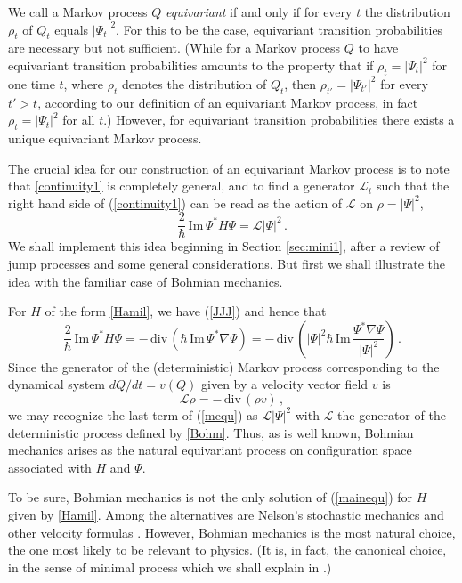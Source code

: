 \documentclass[12pt]{article}
\newcommand{\1}{\mathbf{1}} %
\renewcommand{\Im}{\mathrm{Im}} %
\renewcommand{\div}{\,\mathrm{div}\,} %
\newcommand{\generator}{\mathscr{L}} %
\begin{document}
We call a Markov process $Q$ \emph{equivariant} if and only if for every
$t$ the distribution $\rho_t$ of $Q_t$ equals $|\Psi_t|^2$. For this to 
be
the case, equivariant transition probabilities are necessary but not
sufficient. (While  for a Markov process $Q$  to have equivariant
transition probabilities amounts to the property that if $\rho_t =
|\Psi_t|^2$ for one time $t$, where $\rho_t$ denotes the distribution of
$Q_t$, then $\rho_{t'} = |\Psi_{t'}|^2$ for every $t'>t$,  according to
our definition of an equivariant Markov process, in fact $\rho_t =
|\Psi_t|^2$ for all $t$.)  However, for equivariant transition
probabilities there exists a unique equivariant Markov process.

The crucial idea for our construction of an equivariant Markov process
is to note that \eqref{continuity1} is completely general, and to find
a generator $\generator_t$ such that the right hand side of
(\ref{continuity1}) can be read as the action of $\generator$ on $\rho
= |\Psi|^2$,
\begin{equation}\label{mainequ}
    \frac{2}{\hbar} \, \Im \, \Psi^* H\Psi = \generator |\Psi|^2\,.
\end{equation}
We shall implement this idea beginning in Section \ref{sec:mini1},
after a review of jump processes and some general considerations. But
first we shall illustrate the idea with the familiar case of Bohmian
mechanics.

For $H$ of the form \eqref{Hamil}, we have (\ref{JJJ}) and hence that
\begin{equation}\label{mequ}
   \frac{2}{\hbar} \, \Im \, \Psi^*H\Psi = -\div\left(\hbar \, \Im \,
   \Psi^* \nabla\Psi \right) = -\div\left( |\Psi|^2 \hbar \, \Im \,
   \frac{\Psi^* \nabla\Psi} {|\Psi|^2} \right) \,.
\end{equation}
Since the generator of the (deterministic) Markov process
corresponding to the dynamical system $dQ/dt=v(Q)$ given by a velocity
vector field $v$ is
\begin{equation}\label{dynamical}
   \generator \rho = -\div(\rho v)\,,
\end{equation}
we may recognize the last term of (\ref{mequ}) as $\generator
|\Psi|^2$ with $\generator$ the generator of the deterministic process
defined by \eqref{Bohm}. Thus, as is well known, Bohmian mechanics
arises as the natural equivariant process on configuration space
associated with $H$ and $\Psi$.

To be sure, Bohmian mechanics is not the only solution of
(\ref{mainequ}) for $H$ given by \eqref{Hamil}. Among the alternatives
are Nelson's stochastic mechanics \cite{stochmech} and other velocity
formulas \cite{Deotto}. However, Bohmian mechanics is the most natural
choice, the one most likely to be relevant to physics. (It is, in fact,
the canonical choice, in the sense of minimal process which we shall
explain in \cite[Sec.~5.2]{crea2B}.)
\end{document}
